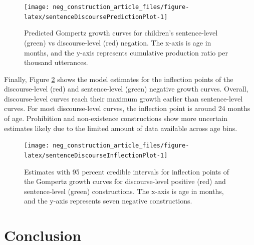 \documentclass[
  man,floatsintext]{apa6}
\begin{document}
\begin{figure}[H]

{\centering \texttt{[image: neg\_construction\_article\_files/figure-latex/sentenceDiscoursePredictionPlot-1]} 

}

\caption{Predicted Gompertz growth curves for children's sentence-level (green) vs discourse-level (red) negation. The x-axis is age in months, and the y-axis represents cumulative production ratio per thousand utterances.}\label{fig:sentenceDiscoursePredictionPlot}
\end{figure}

Finally, Figure \ref{fig:sentenceDiscourseInflectionPlot} shows the model estimates for the inflection points of the discourse-level (red) and sentence-level (green) negative growth curves. Overall, discourse-level curves reach their maximum growth earlier than sentence-level curves. For most discourse-level curves, the inflection point is around 24 months of age. Prohibition and non-existence constructions show more uncertain estimates likely due to the limited amount of data available across age bins.

\begin{figure}[H]

{\centering \texttt{[image: neg\_construction\_article\_files/figure-latex/sentenceDiscourseInflectionPlot-1]} 

}

\caption{Estimates with 95 percent credible intervals for inflection points of the Gompertz growth curves for discourse-level positive (red) and sentence-level (green) constructions. The x-axis is age in months, and the y-axis represents seven negative constructions.}\label{fig:sentenceDiscourseInflectionPlot}
\end{figure}

\hypertarget{conclusion}{%
\section{Conclusion}\label{conclusion}}
\end{document}
